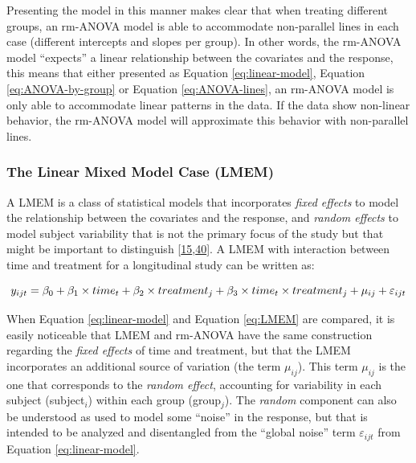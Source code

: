 \documentclass[
]{article}
\begin{document}
Presenting the model in this manner makes clear that when treating different groups, an rm-ANOVA model is able to accommodate non-parallel lines in each case (different intercepts and slopes per group). In other words, the rm-ANOVA model ``expects'' a linear relationship between the covariates and the response, this means that either presented as Equation \eqref{eq:linear-model}, Equation \eqref{eq:ANOVA-by-group} or Equation \eqref{eq:ANOVA-lines}, an rm-ANOVA model is only able to accommodate linear patterns in the data. If the data show non-linear behavior, the rm-ANOVA model will approximate this behavior with non-parallel lines.

\hypertarget{the-linear-mixed-model-case-lmem}{%
\subsubsection{The Linear Mixed Model Case (LMEM)}\label{the-linear-mixed-model-case-lmem}}

A LMEM is a class of statistical models that incorporates \emph{fixed effects} to model the relationship between the covariates and the response, and \emph{random effects} to model subject variability that is not the primary focus of the study but that might be important to distinguish {[}\protect\hyperlink{ref-pinheiro2006}{15},\protect\hyperlink{ref-west2014}{40}{]}. A LMEM with interaction between time and treatment for a longitudinal study can be written as:

\begin{equation}
y_{ijt} = \beta_0+ \beta_1 \times time_{t} + \beta_2 \times treatment_{j} + \beta_3 \times time_{t}\times treatment_{j}+\mu_{ij} +\varepsilon_{ijt}\\ 
\label{eq:LMEM}
\end{equation}

When Equation \eqref{eq:linear-model} and Equation \eqref{eq:LMEM} are compared, it is easily noticeable that LMEM and rm-ANOVA have the same construction regarding the \emph{fixed effects} of time and treatment, but that the LMEM incorporates an additional source of variation (the term \(\mu_{ij}\)). This term \(\mu_{ij}\) is the one that corresponds to the \emph{random effect}, accounting for variability in each subject (subject\(_i\)) within each group (group\(_j\)). The \emph{random} component can also be understood as used to model some ``noise'' in the response, but that is intended to be analyzed and disentangled from the ``global noise'' term \(\varepsilon_{ijt}\) from Equation \eqref{eq:linear-model}.
\end{document}
